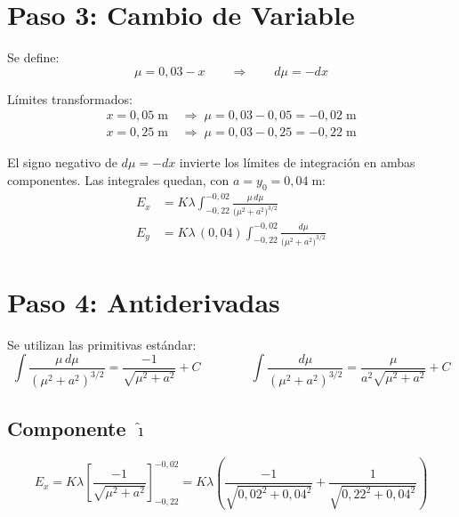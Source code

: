 \documentclass[12pt,letterpaper]{article}
\begin{document}
\section*{Paso 3: Cambio de Variable}

Se define:
\begin{equation*}
    \mu = 0{,}03 - x \qquad \Rightarrow \qquad d\mu = -dx
\end{equation*}

L\'imites transformados:
\begin{align*}
    x = 0{,}05\;\text{m} &\;\Rightarrow\; \mu = 0{,}03 - 0{,}05 = -0{,}02\;\text{m}\\
    x = 0{,}25\;\text{m} &\;\Rightarrow\; \mu = 0{,}03 - 0{,}25 = -0{,}22\;\text{m}
\end{align*}

El signo negativo de $d\mu = -dx$ invierte los l\'imites de integraci\'on en ambas componentes. Las integrales quedan, con $a = y_0 = 0{,}04\;\text{m}$:
\begin{align*}
    E_x &= K\lambda\int_{-0{,}22}^{-0{,}02}
            \frac{\mu\,d\mu}{\bigl(\mu^2 + a^2\bigr)^{3/2}}
    \\[8pt]
    E_y &= K\lambda\,(0{,}04)\int_{-0{,}22}^{-0{,}02}
            \frac{d\mu}{\bigl(\mu^2 + a^2\bigr)^{3/2}}
\end{align*}

\section*{Paso 4: Antiderivadas}

Se utilizan las primitivas est\'andar:
\begin{equation*}
    \int \frac{\mu\,d\mu}{(\mu^2+a^2)^{3/2}} = \frac{-1}{\sqrt{\mu^2+a^2}} + C
    \qquad\qquad
    \int \frac{d\mu}{(\mu^2+a^2)^{3/2}} = \frac{\mu}{a^2\sqrt{\mu^2+a^2}} + C
\end{equation*}

\subsection*{Componente $\hat{\imath}$}

\begin{equation*}
    E_x = K\lambda \left[\frac{-1}{\sqrt{\mu^2 + a^2}}\right]_{-0{,}22}^{-0{,}02}
        = K\lambda \left(\frac{-1}{\sqrt{0{,}02^2 + 0{,}04^2}}
                        + \frac{1}{\sqrt{0{,}22^2 + 0{,}04^2}}\right)
\end{equation*}
\end{document}
